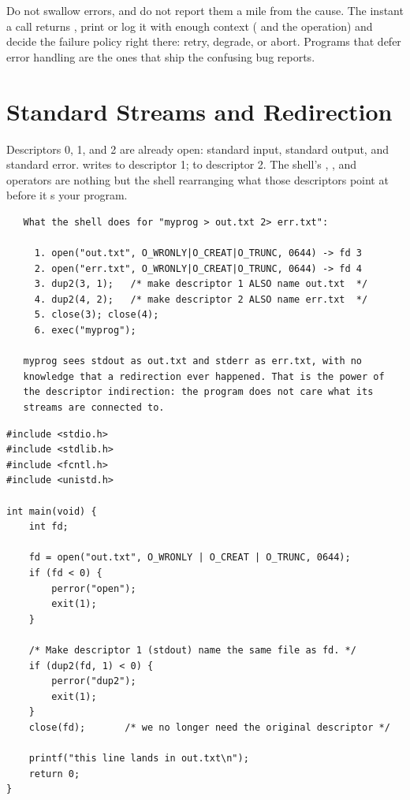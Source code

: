 \begin{ruleofthumb}
Do not swallow errors, and do not report them a mile from the cause.
The instant a call returns , print or log it with enough
context ( and the operation) and decide the failure policy
right there: retry, degrade, or abort. Programs that defer error
handling are the ones that ship the confusing bug reports.
\end{ruleofthumb}

\section{Standard Streams and Redirection}

Descriptors 0, 1, and 2 are already open: standard input, standard
output, and standard error.  writes to descriptor 1;
 to descriptor 2. The shell's
\code{>}, \code{<}, and  operators are nothing but the shell
rearranging what those descriptors point at before it s your
program.

\begin{verbatim}
   What the shell does for "myprog > out.txt 2> err.txt":

     1. open("out.txt", O_WRONLY|O_CREAT|O_TRUNC, 0644) -> fd 3
     2. open("err.txt", O_WRONLY|O_CREAT|O_TRUNC, 0644) -> fd 4
     3. dup2(3, 1);   /* make descriptor 1 ALSO name out.txt  */
     4. dup2(4, 2);   /* make descriptor 2 ALSO name err.txt  */
     5. close(3); close(4);
     6. exec("myprog");

   myprog sees stdout as out.txt and stderr as err.txt, with no
   knowledge that a redirection ever happened. That is the power of
   the descriptor indirection: the program does not care what its
   streams are connected to.
\end{verbatim}

\begin{lstlisting}[caption={Redirecting stdout inside your own program.}]
#include <stdio.h>
#include <stdlib.h>
#include <fcntl.h>
#include <unistd.h>

int main(void) {
    int fd;

    fd = open("out.txt", O_WRONLY | O_CREAT | O_TRUNC, 0644);
    if (fd < 0) {
        perror("open");
        exit(1);
    }

    /* Make descriptor 1 (stdout) name the same file as fd. */
    if (dup2(fd, 1) < 0) {
        perror("dup2");
        exit(1);
    }
    close(fd);       /* we no longer need the original descriptor */

    printf("this line lands in out.txt\n");
    return 0;
}
\end{lstlisting}

